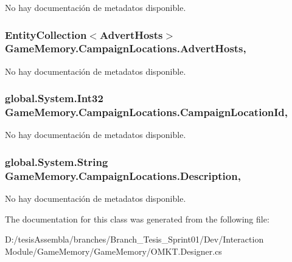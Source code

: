 No hay documentación de metadatos disponible. 

\hypertarget{class_game_memory_1_1_campaign_locations_a5cd8ae0985a1191321033d26d09c5231}{
\subsubsection[{Advert\-Hosts}]{\setlength{\rightskip}{0pt plus 5cm}Entity\-Collection$<${\bf Advert\-Hosts}$>$ Game\-Memory.\-Campaign\-Locations.\-Advert\-Hosts\hspace{0.3cm}{\ttfamily [get]}, {\ttfamily [set]}}}\label{class_game_memory_1_1_campaign_locations_a5cd8ae0985a1191321033d26d09c5231}


No hay documentación de metadatos disponible. 

\hypertarget{class_game_memory_1_1_campaign_locations_a274c121c958554b8ab18ef8b4d2aaf92}{
\subsubsection[{Campaign\-Location\-Id}]{\setlength{\rightskip}{0pt plus 5cm}global.\-System.\-Int32 Game\-Memory.\-Campaign\-Locations.\-Campaign\-Location\-Id\hspace{0.3cm}{\ttfamily [get]}, {\ttfamily [set]}}}\label{class_game_memory_1_1_campaign_locations_a274c121c958554b8ab18ef8b4d2aaf92}


No hay documentación de metadatos disponible. 

\hypertarget{class_game_memory_1_1_campaign_locations_a8cff8e401fb34c18237a7170f521f661}{
\subsubsection[{Description}]{\setlength{\rightskip}{0pt plus 5cm}global.\-System.\-String Game\-Memory.\-Campaign\-Locations.\-Description\hspace{0.3cm}{\ttfamily [get]}, {\ttfamily [set]}}}\label{class_game_memory_1_1_campaign_locations_a8cff8e401fb34c18237a7170f521f661}


No hay documentación de metadatos disponible. 



The documentation for this class was generated from the following file\-:\begin{DoxyCompactItemize}
\item 
D\-:/tesis\-Assembla/branches/\-Branch\-\_\-\-Tesis\-\_\-\-Sprint01/\-Dev/\-Interaction Module/\-Game\-Memory/\-Game\-Memory/O\-M\-K\-T.\-Designer.\-cs\end{DoxyCompactItemize}
